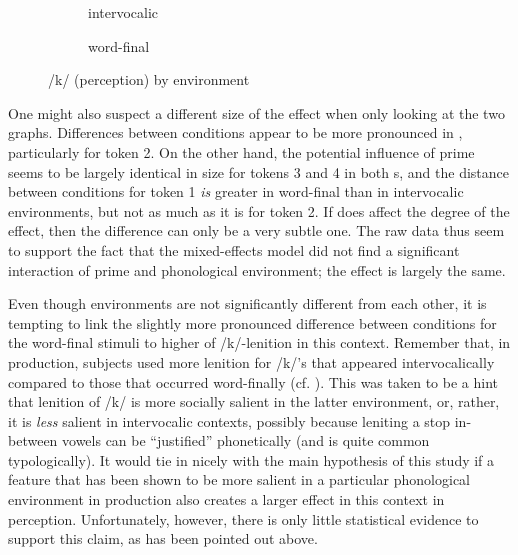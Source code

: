 \begin{figure}
	
	\begin{subfigure}{0.49\textwidth}
		
			\resizebox{\linewidth}{!}{} 
		\caption{intervocalic}
		\label{fig.bar.k.ext.intervoc}
	\end{subfigure}
	\begin{subfigure}{0.49\textwidth}
		
			\resizebox{\linewidth}{!}{}
		\caption{word-final}
		\label{fig.bar.k.ext.wordfinal}
	\end{subfigure}
	\caption{/k/ (perception) by environment}
	\label{fig.bar.k.ext.environment}
\end{figure}

One might also suspect a different size of the  effect when only looking at the two graphs.
Differences between conditions appear to be more pronounced in , particularly for token 2.
On the other hand, the potential influence of prime seems to be largely identical in size for tokens 3 and 4 in both s, and the distance between conditions for token 1 \emph{is} greater in word-final than in intervocalic environments, but not as much as it is for token 2.
If  does affect the degree of the  effect, then the difference can only be a very subtle one.
The raw data thus seem to support the fact that the mixed-effects model did not find a significant interaction of prime and phonological environment; the effect is largely the same.

Even though environments are not significantly different from each other, it is tempting to link the slightly more pronounced difference between  conditions for the word-final stimuli to higher  of /k/-lenition in this context.
Remember that, in production, subjects used more lenition for /k/'s that appeared intervocalically compared to those that occurred word-finally (cf. ).
This was taken to be a hint that lenition of /k/ is more socially salient in the latter environment, or, rather, it is \emph{less} salient in intervocalic contexts, possibly because leniting a stop in-between vowels can be ``justified'' phonetically (and is quite common typologically).
It would tie in nicely with the main hypothesis of this study if a feature that has been shown to be more salient in a particular phonological environment in production also creates a larger  effect in this context in perception.
Unfortunately, however, there is only little statistical evidence to support this claim, as has been pointed out above.

